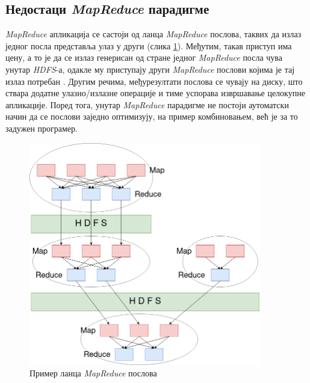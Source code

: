 \documentclass[12pt,oneside]{memoir}
\begin{document}

\subsection{Недостаци \textit{MapReduce} парадигме}
\label{subsec:nedost_mr}

\textit{MapReduce} апликација се састоји од ланца \textit{MapReduce} послова, таквих да излаз једног посла представља улаз у други (слика \ref{fig:mr_app_example}). Међутим, такав приступ има цену, а то је да се излаз генерисан од стране једног \textit{MapReduce} посла чува унутар \textit{HDFS}-а, одакле му приступају други \textit{MapReduce} послови којима је тај излаз потребан \cite{hadoop_learning}. Другим речима, међурезултати послова се чувају на диску, што ствара додатне улазно/излазне операције и тиме успорава извршавање целокупне апликације. Поред тога, унутар \textit{MapReduce} парадигме не постоји аутоматски начин да се послови заједно оптимизују, на пример комбиновањем, већ је за то задужен програмер.

\begin{figure}[!ht]
  \centering
  \includegraphics[width=0.9\textwidth]{pictures/mr_app.png}
  \caption{Пример ланца \textit{MapReduce} послова}
  \label{fig:mr_app_example}
\end{figure}
\end{document}
